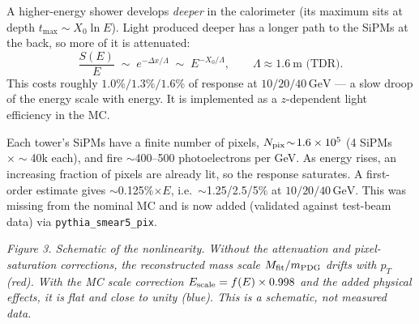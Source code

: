 \documentclass[11pt]{article}
\newcommand{\GeV}{\,\text{GeV}}
\begin{document}
\begin{description}[leftmargin=1.6em]
  \item[(1) Longitudinal light attenuation in the SPACAL fibers.]
    A higher-energy shower develops \emph{deeper} in the calorimeter (its
    maximum sits at depth $t_{\max}\sim X_0\ln E$). Light produced deeper has a
    longer path to the SiPMs at the back, so more of it is attenuated:
    \begin{equation}
      \frac{S(E)}{E}\;\sim\;e^{-\Delta x/\Lambda}\;\sim\;E^{-X_0/\Lambda},
      \qquad \Lambda\approx1.6\ \text{m (TDR)}.
    \end{equation}
    This costs roughly $1.0\%/1.3\%/1.6\%$ of response at $10/20/40\GeV$ ---
    a slow droop of the energy scale with energy. It is implemented as a
    $z$-dependent light efficiency in the MC.

  \item[(2) SiPM pixel saturation / occupancy.]
    Each tower's SiPMs have a finite number of pixels,
    $N_{\rm pix}\!\sim\!1.6\times10^5$ (4 SiPMs $\times\sim$40k each), and fire
    $\sim$400--500 photoelectrons per GeV. As energy rises, an increasing
    fraction of pixels are already lit, so the response saturates. A first-order
    estimate gives $\sim$0.125\%$\times E$, i.e.\ $\sim$1.25/2.5/5\% at
    $10/20/40\GeV$. This was missing from the nominal MC and is now added
    (validated against test-beam data) via \texttt{pythia\_smear5\_pix}.
\end{description}

\begin{center}
\end{center}
\noindent\textit{Figure 3. Schematic of the nonlinearity. Without the
attenuation and pixel-saturation corrections, the reconstructed mass scale
$M_{\rm fit}/m_{\rm PDG}$ drifts with $p_T$ (red). With the MC scale correction
$E_{\rm scale}=f(E)\times0.998$ and the added physical effects, it is flat and
close to unity (blue). This is a schematic, not measured data.}
\end{document}
